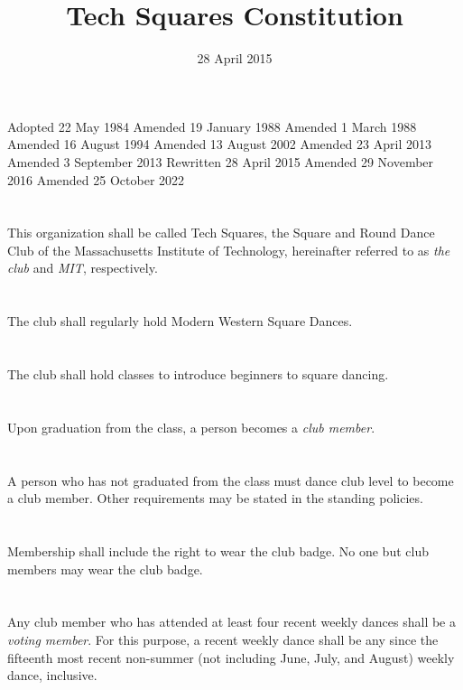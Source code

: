 \documentclass{bylaws}
\title{Tech Squares Constitution}
\date{28 April 2015}
\begin{document}
\maketitle

\begin{history}
Adopted 22 May 1984
Amended 19 January 1988
Amended 1 March 1988
Amended 16 August 1994
Amended 13 August 2002
Amended 23 April 2013
Amended 3 September 2013
Rewritten 28 April 2015
Amended 29 November 2016
Amended 25 October 2022
\end{history}


\section{}This organization shall be called Tech Squares, the Square and Round Dance Club of the Massachusetts Institute of Technology, hereinafter referred to as \textit{the club} and \textit{MIT}, respectively.
\section{}The club shall regularly hold Modern Western Square Dances.
\section{}The club shall hold classes to introduce beginners to square dancing.


\section{}Upon graduation from the class, a person becomes a \textit{club member}.
\section{}A person who has not graduated from the class must dance club level to become a club member. Other requirements may be stated in the standing policies.
\section{}Membership shall include the right to wear the club badge. No one but club members may wear the club badge.
\section{}Any club member who has attended at least four recent weekly dances shall be a \textit{voting member}. For this purpose, a recent weekly dance shall be any since the fifteenth most recent non-summer (not including June, July, and August) weekly dance, inclusive.
\end{document}
